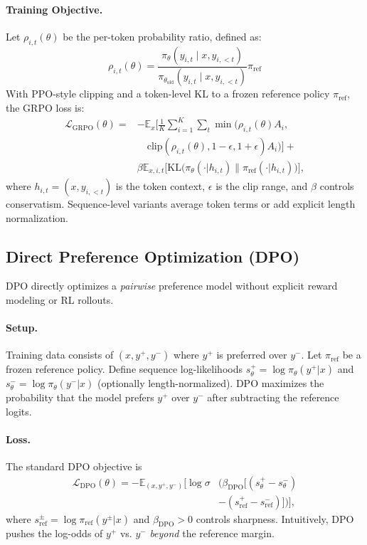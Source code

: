 \documentclass[11pt]{article}
\begin{document}
\paragraph{Training Objective.} Let $\rho_{i,t}(\theta)$ be the per-token probability ratio, defined as:
\[
\rho_{i,t}(\theta) = \frac{\pi_\theta(y_{i,t} \mid x, y_{i,<t})}{\pi_{\theta_{\mathrm{old}}}(y_{i,t} \mid x, y_{i,<t})}\pi_{\mathrm{ref}}
\]
With PPO-style clipping and a token-level KL to a frozen reference policy $\pi_{\mathrm{ref}}$, the GRPO loss is:
\begin{equation}
\begin{split}
\mathcal{L}_{\mathrm{GRPO}}(\theta) = & -\mathbb{E}_{x}\Bigg[ \frac{1}{K}\sum_{i=1}^{K}\sum_{t} \min\Big(\rho_{i,t}(\theta)A_i, \\
& \quad \mathrm{clip}(\rho_{i,t}(\theta), 1-\epsilon, 1+\epsilon)A_i\Big) \Bigg] + \\
& \beta \mathbb{E}_{x,i,t} \Big[ \mathrm{KL}\big(\pi_\theta(\cdot|h_{i,t}) \| \pi_{\mathrm{ref}}(\cdot|h_{i,t})\big) \Big],
\end{split}
\end{equation}
where $h_{i,t}=(x,y_{i,<t})$ is the token context, $\epsilon$ is the clip range, and $\beta$ controls conservatism. Sequence-level variants average token terms or add explicit length normalization.


\subsection{Direct Preference Optimization (DPO)}
\label{dpo}
DPO directly optimizes a \emph{pairwise} preference model without explicit reward modeling or RL rollouts.

\paragraph{Setup.} Training data consists of $(x, y^+, y^-)$ where $y^+$ is preferred over $y^-$. Let $\pi_{\mathrm{ref}}$ be a frozen reference policy. Define sequence log-likelihoods $s_\theta^+=\log\pi_\theta(y^+|x)$ and $s_\theta^-=\log\pi_\theta(y^-|x)$ (optionally length-normalized). DPO maximizes the probability that the model prefers $y^+$ over $y^-$ after subtracting the reference logits.

\paragraph{Loss.} The standard DPO objective is
\begin{equation}
\begin{split}
\mathcal{L}_{\mathrm{DPO}}(\theta) = -\mathbb{E}_{(x,y^+,y^-)}\bigg[ \log\sigma & \Big( \beta_{\mathrm{DPO}} \big[ (s_\theta^+ - s_\theta^-) \\
& - (s_{\mathrm{ref}}^+ - s_{\mathrm{ref}}^-) \big] \Big) \bigg],
\end{split}
\end{equation}
where $s_{\mathrm{ref}}^\pm=\log\pi_{\mathrm{ref}}(y^\pm|x)$ and $\beta_{\mathrm{DPO}}>0$ controls sharpness. Intuitively, DPO pushes the log-odds of $y^+$ vs. $y^-$ \emph{beyond} the reference margin.
\end{document}
